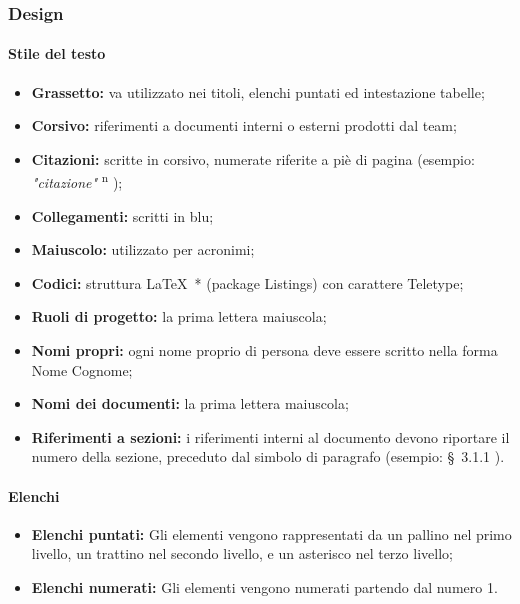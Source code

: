 \documentclass[11pt,a4paper]{article}
\begin{document}
	\subsubsection{Design}
	
	\paragraph{Stile del testo}
	
	\noindent   
	\begin{itemize}
		\item \textbf{Grassetto:} va utilizzato nei titoli, elenchi puntati ed intestazione tabelle;
		\item \textbf{Corsivo:} riferimenti a documenti interni o esterni prodotti dal team;
		\item \textbf{Citazioni:} scritte in corsivo, numerate riferite a piè di pagina (esempio: \textit{"citazione"} \textsuperscript{n} );
		\item \textbf{Collegamenti:} scritti in blu;
		\item \textbf{Maiuscolo:} utilizzato per acronimi;
		\item \textbf{Codici:} struttura \LaTeX\ * (package Listings) con carattere Teletype;
		\item \textbf{Ruoli di progetto:} la prima lettera maiuscola;
		\item \textbf{Nomi propri:} ogni nome proprio di persona deve essere scritto nella forma Nome Cognome;
		\item \textbf{Nomi dei documenti:} la prima lettera maiuscola;
		\item \textbf{Riferimenti a sezioni:} i riferimenti interni al documento devono riportare il numero della sezione, preceduto dal simbolo di paragrafo (esempio: \S\ {3.1.1} ).
		
	\end{itemize}


	\paragraph{Elenchi}
	\begin{itemize}
	\item \textbf{Elenchi puntati:} Gli elementi vengono rappresentati da un pallino nel primo livello, un trattino nel secondo livello, e un asterisco nel terzo livello; 
	\item \textbf{Elenchi numerati:} Gli elementi vengono numerati partendo dal numero 1.
	\end{itemize}
\end{document}
